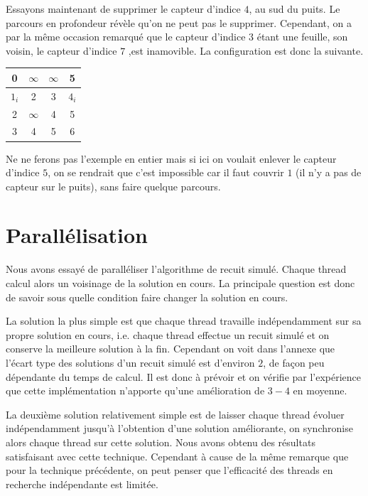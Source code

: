 \documentclass[12pt,a4paper]{article}
\begin{document}
Essayons maintenant de supprimer le capteur d'indice $4$, au sud du puits. Le parcours en profondeur révèle qu'on ne peut pas le supprimer. Cependant, on a par la même occasion remarqué que le capteur d'indice $3$ étant une feuille, son voisin, le capteur d'indice $7$ ,est inamovible. La configuration est donc la suivante.

\begin{center}
\begin{tabular}{|c|c|c|c|}
\hline 
0 & $\infty$ & $\infty$ & 5 \\ 
\hline 
$1_i$ & 2 & 3 & $4_i$ \\ 
\hline 
2 & $\infty$ & 4 & 5 \\ 
\hline 
3 & 4 & 5 & 6 \\ 
\hline 

\end{tabular} 
\end{center}

Ne ne ferons pas l'exemple en entier mais si ici on voulait enlever le capteur d'indice $5$, on se rendrait que c'est impossible car il faut couvrir $1$ (il n'y a pas de capteur sur le puits), sans faire quelque parcours.
\section{Parallélisation}
Nous avons essayé de paralléliser l'algorithme de recuit simulé. Chaque thread calcul alors un voisinage de la solution en cours. La principale question est donc de savoir sous quelle condition faire changer la solution en cours. 

La solution la plus simple est que chaque thread travaille indépendamment sur sa propre solution en cours, i.e. chaque thread effectue un recuit simulé et on conserve la meilleure solution à la fin. Cependant on voit dans l'annexe que l'écart type des solutions d'un recuit simulé est d'environ $2$, de façon peu dépendante du temps de calcul. Il est donc à prévoir et on vérifie par l'expérience que cette implémentation n'apporte qu'une amélioration de $3-4$ en moyenne.

La deuxième solution relativement simple est de laisser chaque thread évoluer indépendamment jusqu'à l'obtention d'une solution améliorante, on synchronise alors chaque thread sur cette solution. Nous avons obtenu des résultats satisfaisant avec cette technique. Cependant à cause de la même remarque que pour la technique précédente, on peut penser que l'efficacité des threads en recherche indépendante est limitée.
\end{document}
